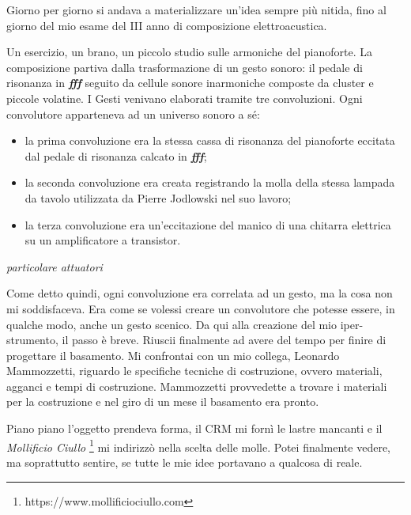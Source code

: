 Giorno per giorno si andava a materializzare un'idea sempre più nitida, fino al giorno del mio esame del III anno di composizione elettroacustica. 

Un esercizio, un brano, un piccolo studio sulle armoniche del pianoforte. La composizione partiva dalla trasformazione di un gesto sonoro: il pedale di risonanza in \textit{\textbf{fff}} seguito da cellule sonore inarmoniche composte da cluster e piccole volatine. I Gesti venivano elaborati tramite tre convoluzioni. Ogni convolutore apparteneva ad un universo sonoro a sé:
\begin{itemize}
\item{la prima convoluzione era la stessa cassa di risonanza del pianoforte eccitata dal pedale di risonanza calcato in \textit{\textbf{fff}};}
\item{la seconda convoluzione era creata registrando la molla della stessa lampada da tavolo utilizzata da Pierre Jodlowski nel suo lavoro;}
\item{la terza convoluzione era un'eccitazione del manico di una chitarra elettrica su un amplificatore a transistor.}
\end{itemize}

\begin{floatingfigure}{10cm}
\mbox{}
\small{\caption{\textit{particolare attuatori}}}
\end{floatingfigure}
Come detto quindi, ogni convoluzione era correlata ad un gesto, ma la cosa non mi soddisfaceva. Era come se volessi creare un convolutore che potesse essere, in qualche modo, anche un gesto scenico. Da qui alla creazione del mio iper-strumento, il passo è breve. Riuscii finalmente ad avere del tempo per finire di progettare il basamento. Mi confrontai con un mio collega, Leonardo Mammozzetti, riguardo le specifiche tecniche di costruzione, ovvero materiali, agganci e tempi di costruzione. Mammozzetti provvedette a trovare i materiali per la costruzione e nel giro di un mese il basamento era pronto.  

Piano piano l'oggetto prendeva forma, il CRM mi fornì le lastre mancanti e il \textit{Mollificio Ciullo} \footnote{https://www.mollificiociullo.com} mi indirizzò nella scelta delle molle. Potei finalmente vedere, ma soprattutto sentire, se tutte le mie idee portavano a qualcosa di reale.

